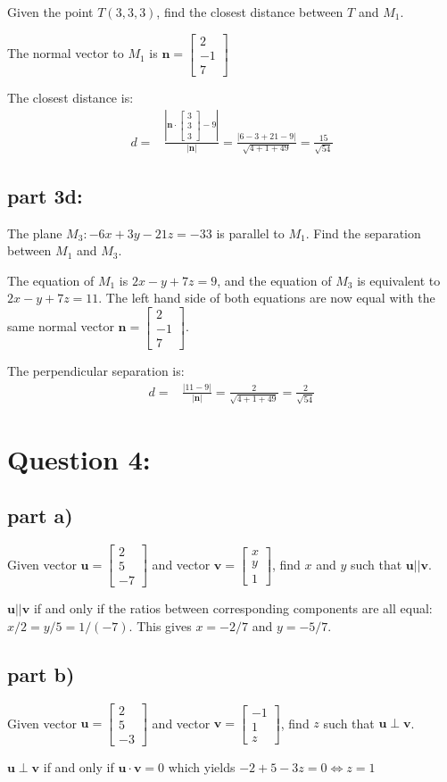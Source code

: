 \documentclass{article}
\newcommand{\abs}[1]{\left|#1\right|}
\newcommand{\colvec}[3]{\begin{bmatrix} #1 \\ #2 \\ #3 \end{bmatrix}}
\newcommand{\dr}[1]{\textcolor{dark_red}{#1}}
\begin{document}
Given the point \(T(3,3,3)\), find the closest distance between \(T\) and \(M_1\). 

\dr{The normal vector to \(M_1\) is \(\mathbf{n} = \colvec{2}{-1}{7}\)}

\dr{The closest distance is: 
\begin{align*}
d = & \frac{\abs{\mathbf{n} \cdot \colvec{3}{3}{3} - 9}}{\abs{\mathbf{n}}} 
= \frac{\abs{6 - 3 + 21 - 9}}{\sqrt{4 + 1 + 49}} 
= \frac{15}{\sqrt{54}}
\end{align*}} 


\subsection*{part 3d:} 

The plane \(M_3: -6x + 3y - 21z = -33\) is parallel to \(M_1\). Find the separation between \(M_1\) and \(M_3\). 

\dr{The equation of \(M_1\) is \(2x - y + 7z = 9\), and the equation of \(M_3\) is equivalent to \(2x - y + 7z = 11\). The left hand side of both equations are now equal with the same normal vector \(\mathbf{n} = \colvec{2}{-1}{7}\).} 

\dr{The perpendicular separation is:
\begin{align*}
d = & \frac{\abs{11 - 9}}{\abs{\mathbf{n}}} 
= \frac{2}{\sqrt{4 + 1 + 49}} 
= \frac{2}{\sqrt{54}} 
\end{align*}}



\section*{Question 4:}

\subsection*{part a)}

Given vector \(\mathbf{u} = \colvec{2}{5}{-7}\) and vector \(\mathbf{v} = \colvec{x}{y}{1}\), find \(x\) and \(y\) such that \(\mathbf{u} || \mathbf{v}\).

\dr{\(\mathbf{u} || \mathbf{v}\) if and only if the ratios between corresponding components are all equal: \(x/2 = y/5 = 1/(-7)\). This gives \(x = -2/7\) and \(y = -5/7\).}


\subsection*{part b)}

Given vector \(\mathbf{u} = \colvec{2}{5}{-3}\) and vector \(\mathbf{v} = \colvec{-1}{1}{z}\), find \(z\) such that \(\mathbf{u} \perp \mathbf{v}\).

\dr{\(\mathbf{u} \perp \mathbf{v}\) if and only if \(\mathbf{u} \cdot \mathbf{v} = 0\) which yields \(-2 + 5 - 3z = 0 \iff z = 1\)}
\end{document}
